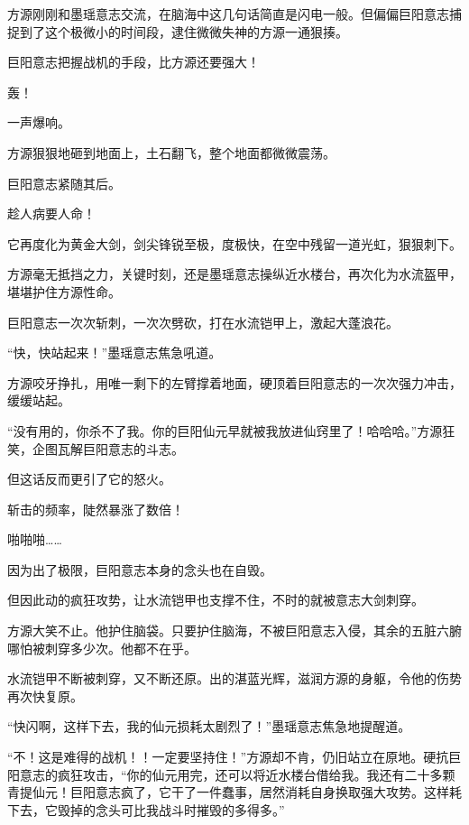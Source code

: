 
\begin{this_body}



方源刚刚和墨瑶意志交流，在脑海中这几句话简直是闪电一般。但偏偏巨阳意志捕捉到了这个极微小的时间段，逮住微微失神的方源一通狠揍。

巨阳意志把握战机的手段，比方源还要强大！

轰！

一声爆响。

方源狠狠地砸到地面上，土石翻飞，整个地面都微微震荡。

巨阳意志紧随其后。

趁人病要人命！

它再度化为黄金大剑，剑尖锋锐至极，度极快，在空中残留一道光虹，狠狠刺下。

方源毫无抵挡之力，关键时刻，还是墨瑶意志操纵近水楼台，再次化为水流盔甲，堪堪护住方源性命。

巨阳意志一次次斩刺，一次次劈砍，打在水流铠甲上，激起大蓬浪花。

“快，快站起来！”墨瑶意志焦急吼道。

方源咬牙挣扎，用唯一剩下的左臂撑着地面，硬顶着巨阳意志的一次次强力冲击，缓缓站起。

“没有用的，你杀不了我。你的巨阳仙元早就被我放进仙窍里了！哈哈哈。”方源狂笑，企图瓦解巨阳意志的斗志。

但这话反而更引了它的怒火。

斩击的频率，陡然暴涨了数倍！

啪啪啪……

因为出了极限，巨阳意志本身的念头也在自毁。

但因此动的疯狂攻势，让水流铠甲也支撑不住，不时的就被意志大剑刺穿。

方源大笑不止。他护住脑袋。只要护住脑海，不被巨阳意志入侵，其余的五脏六腑哪怕被刺穿多少次。他都不在乎。

水流铠甲不断被刺穿，又不断还原。出的湛蓝光辉，滋润方源的身躯，令他的伤势再次快复原。

“快闪啊，这样下去，我的仙元损耗太剧烈了！”墨瑶意志焦急地提醒道。

“不！这是难得的战机！！一定要坚持住！”方源却不肯，仍旧站立在原地。硬抗巨阳意志的疯狂攻击，“你的仙元用完，还可以将近水楼台借给我。我还有二十多颗青提仙元！巨阳意志疯了，它干了一件蠢事，居然消耗自身换取强大攻势。这样耗下去，它毁掉的念头可比我战斗时摧毁的多得多。”


\end{this_body}
